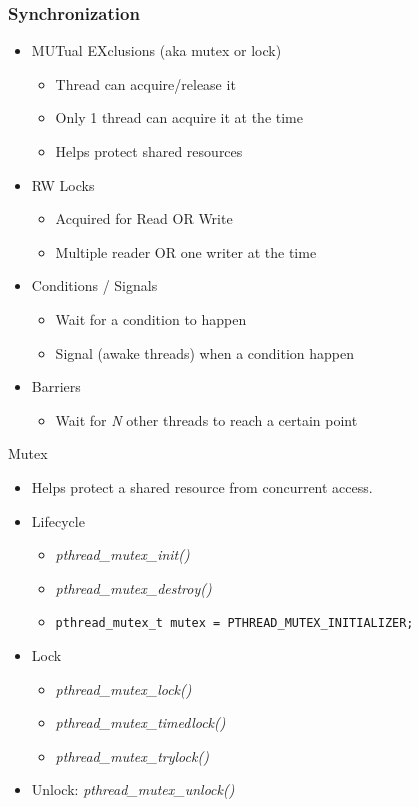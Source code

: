 \begin{frame}
  \frametitle{Synchronization}

  \begin{itemize}
  \item MUTual EXclusions (aka mutex or lock)
    \begin{itemize}
    \item Thread can acquire/release it
    \item Only 1 thread can acquire it at the time
    \item Helps protect shared resources
    \end{itemize}
  \item RW Locks
    \begin{itemize}
    \item Acquired for Read OR Write
    \item Multiple reader OR one writer at the time
    \end{itemize}
  \item Conditions / Signals
    \begin{itemize}
    \item Wait for a condition to happen
    \item Signal (awake threads) when a condition happen
    \end{itemize}
  \item Barriers
    \begin{itemize}
    \item Wait for \emph{N} other threads to reach a certain point
    \end{itemize}
  \end{itemize}

\end{frame}


\begin{frame}[fragile]{Mutex}

  \begin{itemize}
  \item Helps protect a shared resource from concurrent access.
  \item Lifecycle
    \begin{itemize}
    \item \emph{pthread\_mutex\_init()}
    \item \emph{pthread\_mutex\_destroy()}
    \item \verb+pthread_mutex_t mutex = PTHREAD_MUTEX_INITIALIZER;+
    \end{itemize}
  \item Lock
    \begin{itemize}
    \item \emph{pthread\_mutex\_lock()}
    \item \emph{pthread\_mutex\_timedlock()}
    \item \emph{pthread\_mutex\_trylock()}
    \end{itemize}
  \item Unlock: \emph{pthread\_mutex\_unlock()}
  \end{itemize}
\end{frame}


